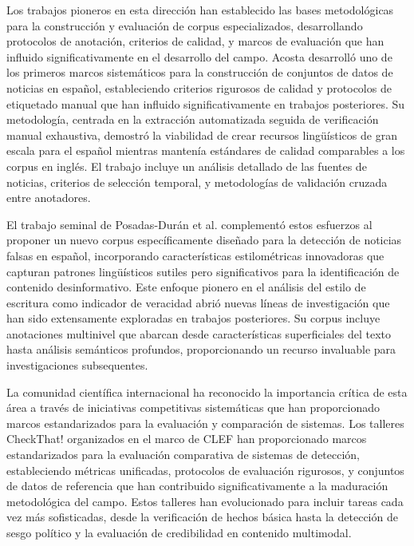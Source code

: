Los trabajos pioneros en esta dirección han establecido las bases metodológicas para la construcción y evaluación de corpus especializados, desarrollando protocolos de anotación, criterios de calidad, y marcos de evaluación que han influido significativamente en el desarrollo del campo. Acosta \cite{acosta2019construccion} desarrolló uno de los primeros marcos sistemáticos para la construcción de conjuntos de datos de noticias en español, estableciendo criterios rigurosos de calidad y protocolos de etiquetado manual que han influido significativamente en trabajos posteriores. Su metodología, centrada en la extracción automatizada seguida de verificación manual exhaustiva, demostró la viabilidad de crear recursos lingüísticos de gran escala para el español mientras mantenía estándares de calidad comparables a los corpus en inglés. El trabajo incluye un análisis detallado de las fuentes de noticias, criterios de selección temporal, y metodologías de validación cruzada entre anotadores.

El trabajo seminal de Posadas-Durán et al. \cite{posadas2019detection} complementó estos esfuerzos al proponer un nuevo corpus específicamente diseñado para la detección de noticias falsas en español, incorporando características estilométricas innovadoras que capturan patrones lingüísticos sutiles pero significativos para la identificación de contenido desinformativo. Este enfoque pionero en el análisis del estilo de escritura como indicador de veracidad abrió nuevas líneas de investigación que han sido extensamente exploradas en trabajos posteriores. Su corpus incluye anotaciones multinivel que abarcan desde características superficiales del texto hasta análisis semánticos profundos, proporcionando un recurso invaluable para investigaciones subsequentes.

La comunidad científica internacional ha reconocido la importancia crítica de esta área a través de iniciativas competitivas sistemáticas que han proporcionado marcos estandarizados para la evaluación y comparación de sistemas. Los talleres CheckThat! organizados en el marco de CLEF \cite{alam2023overview, barron2023clef} han proporcionado marcos estandarizados para la evaluación comparativa de sistemas de detección, estableciendo métricas unificadas, protocolos de evaluación rigurosos, y conjuntos de datos de referencia que han contribuido significativamente a la maduración metodológica del campo. Estos talleres han evolucionado para incluir tareas cada vez más sofisticadas, desde la verificación de hechos básica hasta la detección de sesgo político y la evaluación de credibilidad en contenido multimodal.

